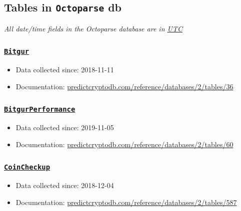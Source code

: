 \documentclass[
]{book}
\begin{document}
\hypertarget{tables-in-octoparse-db}{%
\subsection{\texorpdfstring{Tables in \texttt{Octoparse} db}{Tables in Octoparse db}}\label{tables-in-octoparse-db}}

\emph{All date/time fields in the Octoparse database are in \href{https://www.google.com/search?q=time+utc}{UTC}}

\hypertarget{bitgur}{%
\subsubsection{\texorpdfstring{\href{https://predictcryptodb.com/question/6}{\textbf{\texttt{Bitgur}}}}{Bitgur}}\label{bitgur}}

\begin{itemize}
\item
  Data collected since: 2018-11-11
\item
  Documentation: \href{https://predictcryptodb.com/reference/databases/2/tables/36}{predictcryptodb.com/reference/databases/2/tables/36}
\end{itemize}

\hypertarget{bitgurperformance}{%
\subsubsection{\texorpdfstring{\href{https://predictcryptodb.com/question/7}{\textbf{\texttt{BitgurPerformance}}}}{BitgurPerformance}}\label{bitgurperformance}}

\begin{itemize}
\item
  Data collected since: 2019-11-05
\item
  Documentation: \href{https://predictcryptodb.com/reference/databases/2/tables/60}{predictcryptodb.com/reference/databases/2/tables/60}
\end{itemize}

\hypertarget{coincheckup}{%
\subsubsection{\texorpdfstring{\href{https://predictcryptodb.com/question/11}{\textbf{\texttt{CoinCheckup}}}}{CoinCheckup}}\label{coincheckup}}

\begin{itemize}
\item
  Data collected since: 2018-12-04
\item
  Documentation: \href{https://predictcryptodb.com/reference/databases/2/tables/587}{predictcryptodb.com/reference/databases/2/tables/587}
\end{itemize}
\end{document}
